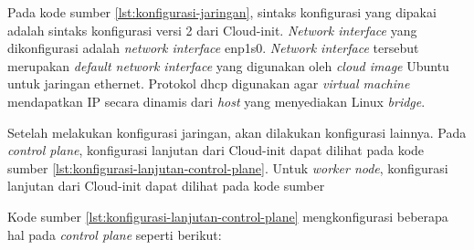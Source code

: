 Pada kode sumber \ref{lst:konfigurasi-jaringan}, sintaks konfigurasi yang dipakai adalah sintaks
konfigurasi versi 2 dari Cloud-init. \emph{Network interface} yang dikonfigurasi adalah \emph{network interface}
enp1s0. \emph{Network interface} tersebut merupakan \emph{default network interface} yang digunakan
oleh \emph{cloud image} Ubuntu untuk jaringan ethernet. Protokol dhcp digunakan agar \emph{virtual machine} mendapatkan
IP secara dinamis dari \emph{host} yang menyediakan Linux \emph{bridge}.

Setelah melakukan konfigurasi jaringan, akan dilakukan konfigurasi lainnya.
Pada \emph{control plane}, konfigurasi lanjutan dari Cloud-init dapat dilihat 
pada kode sumber \ref{lst:konfigurasi-lanjutan-control-plane}.
Untuk \emph{worker node}, konfigurasi lanjutan dari Cloud-init dapat dilihat
pada kode sumber



Kode sumber \ref{lst:konfigurasi-lanjutan-control-plane}
mengkonfigurasi beberapa hal pada \emph{control plane} seperti berikut:

